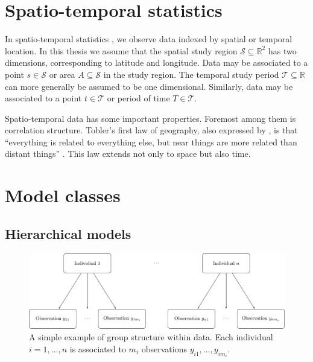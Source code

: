 \documentclass[a4paper, nobind]{templates/ociamthesis}
\begin{document}
\hypertarget{spatio-temporal-statistics}{%
\section{Spatio-temporal statistics}\label{spatio-temporal-statistics}}

In spatio-temporal statistics \autocite{cressie2015statistics}, we observe data indexed by spatial or temporal location.
In this thesis we assume that the spatial study region \(\mathcal{S} \subseteq \mathbb{R}^2\) has two dimensions, corresponding to latitude and longitude.
Data may be associated to a point \(s \in \mathcal{S}\) or area \(A \subseteq \mathcal{S}\) in the study region.
The temporal study period \(\mathcal{T} \subseteq \mathbb{R}\) can more generally be assumed to be one dimensional.
Similarly, data may be associated to a point \(t \in \mathcal{T}\) or period of time \(T \in \mathcal{T}\).

Spatio-temporal data has some important properties.
Foremost among them is correlation structure.
Tobler's first law of geography, also expressed by \textcite{fisher1936design}, is that ``everything is related to everything else, but near things are more related than distant things'' \autocite{tobler1970computer}.
This law extends not only to space but also time.

\hypertarget{hierarchical-lgm-elgm}{%
\section{Model classes}\label{hierarchical-lgm-elgm}}

\hypertarget{hierarchical}{%
\subsection{Hierarchical models}\label{hierarchical}}



\begin{figure}

{\centering \includegraphics[width=0.95\linewidth]{figures/bayesian/hierarchical-structure} 

}

\caption{A simple example of group structure within data. Each individual \(i = 1, \ldots, n\) is associated to \(m_i\) observations \(y_{i1}, \ldots, y_{im_i}\).}\label{fig:hierarchical-structure}
\end{figure}
\end{document}
